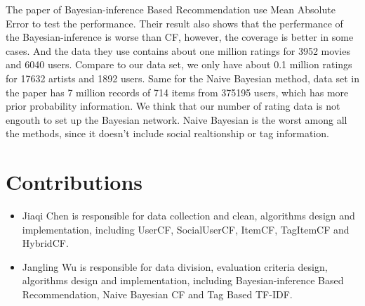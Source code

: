 \documentclass{sig-alternate}
\begin{document}
The paper of Bayesian-inference Based Recommendation use Mean Absolute Error to test the performance.  Their result also shows that the perfermance of the Bayesian-inference is worse than CF, however, the coverage is better in some cases.   And the data they use contains about one million ratings for 3952 movies and 6040 users.  Compare to our data set, we only have about 0.1 million ratings for 17632 artists and 1892 users.    Same for the Naive Bayesian method, data set in the paper has 7 million records of 714 items from 375195 users, which has more prior probability information. We think that our number of rating data is not engouth to set up the Bayesian network.   Naive Bayesian is the worst among all the methods, since it doesn't include social realtionship or tag information.  



\section{Contributions}
\begin{itemize}
\item Jiaqi Chen is responsible for data collection and clean, algorithms design and implementation, including UserCF, SocialUserCF, ItemCF, TagItemCF and HybridCF.
\item Jangling Wu is responsible for data division, evaluation criteria design, algorithms design and 
implementation, including Bayesian-inference Based Recommendation, Naive Bayesian CF and Tag Based TF-IDF.
\end{itemize}



\end{document}
